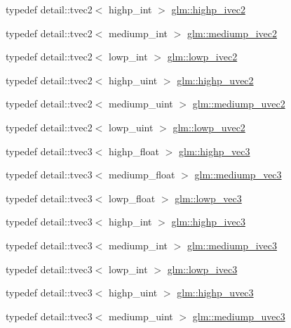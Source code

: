 \begin{DoxyCompactItemize}
\item 
typedef detail\+::tvec2$<$ highp\+\_\+int $>$ \hyperlink{group__core__precision_ga83738eb062e2e6b5e52cd0461da9c742}{glm\+::highp\+\_\+ivec2}
\item 
typedef detail\+::tvec2$<$ mediump\+\_\+int $>$ \hyperlink{group__core__precision_ga4803c44369a1aea2e7e51397c341ce6f}{glm\+::mediump\+\_\+ivec2}
\item 
typedef detail\+::tvec2$<$ lowp\+\_\+int $>$ \hyperlink{group__core__precision_ga5e59209b39a7d334f8b4bad8c01ea045}{glm\+::lowp\+\_\+ivec2}
\item 
typedef detail\+::tvec2$<$ highp\+\_\+uint $>$ \hyperlink{group__core__precision_ga1c56d043a20a6db84fc3d18b227875fb}{glm\+::highp\+\_\+uvec2}
\item 
typedef detail\+::tvec2$<$ mediump\+\_\+uint $>$ \hyperlink{group__core__precision_ga95f22fddbbb9561e648aaa2a461be59c}{glm\+::mediump\+\_\+uvec2}
\item 
typedef detail\+::tvec2$<$ lowp\+\_\+uint $>$ \hyperlink{group__core__precision_gacae56e02818d0da34e70ac934807388c}{glm\+::lowp\+\_\+uvec2}
\item 
typedef detail\+::tvec3$<$ highp\+\_\+float $>$ \hyperlink{group__core__precision_gab660f8916a9c4a72bf71cd4279ae19fb}{glm\+::highp\+\_\+vec3}
\item 
typedef detail\+::tvec3$<$ mediump\+\_\+float $>$ \hyperlink{group__core__precision_gafab50a7800793f88befe5d2a0120c65b}{glm\+::mediump\+\_\+vec3}
\item 
typedef detail\+::tvec3$<$ lowp\+\_\+float $>$ \hyperlink{group__core__precision_gaacc50c233ef2759c852eb90be78bc5fc}{glm\+::lowp\+\_\+vec3}
\item 
typedef detail\+::tvec3$<$ highp\+\_\+int $>$ \hyperlink{group__core__precision_ga8d03a7d21f89a6541a278bf78bb6b1fa}{glm\+::highp\+\_\+ivec3}
\item 
typedef detail\+::tvec3$<$ mediump\+\_\+int $>$ \hyperlink{group__core__precision_gab824e682bc463998efbcd4a512ebf209}{glm\+::mediump\+\_\+ivec3}
\item 
typedef detail\+::tvec3$<$ lowp\+\_\+int $>$ \hyperlink{group__core__precision_ga61fed1e59be72903080596ebbaf2fac5}{glm\+::lowp\+\_\+ivec3}
\item 
typedef detail\+::tvec3$<$ highp\+\_\+uint $>$ \hyperlink{group__core__precision_gade4b43d968dd42ee3215a51de7b86425}{glm\+::highp\+\_\+uvec3}
\item 
typedef detail\+::tvec3$<$ mediump\+\_\+uint $>$ \hyperlink{group__core__precision_gaa69cb8ff23d5c3daa3cf320136ac8e7d}{glm\+::mediump\+\_\+uvec3}

\end{DoxyCompactItemize}

